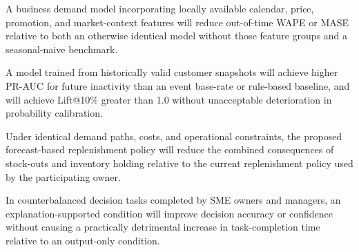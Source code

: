 \documentclass[a4paper,11pt,oneside]{book}
\theoremstyle{plain}
\theoremstyle{definition}
\theoremstyle{remark}
\begin{document}
\begin{description}[style=nextline,leftmargin=2em]

    \item[RQ1 / H1]
    A business demand model incorporating locally available calendar, price,
    promotion, and market-context features will reduce out-of-time WAPE or MASE
    relative to both an otherwise identical model without those feature groups
    and a seasonal-naive benchmark.

    \item[RQ2 / H2]
    A model trained from historically valid customer snapshots will achieve
    higher PR-AUC for future inactivity than an event base-rate or rule-based
    baseline, and will achieve Lift@10\% greater than 1.0 without unacceptable
    deterioration in probability calibration.

    \item[RQ3 / H3]
    Under identical demand paths, costs, and operational constraints, the
    proposed forecast-based replenishment policy will reduce the combined
    consequences of stock-outs and inventory holding relative to the current
    replenishment policy used by the participating owner.

    \item[RQ4 / H4]
    In counterbalanced decision tasks completed by SME owners and managers, an explanation-supported condition
    will improve decision accuracy or confidence without causing a practically
    detrimental increase in task-completion time relative to an output-only
    condition.
\end{description}
\end{document}
